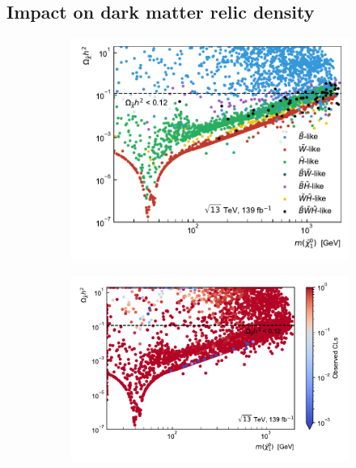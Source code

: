 \subsection{Impact on dark matter relic density}

 \begin{figure}
	\centering
	\begin{subfigure}[b]{0.445\linewidth}
		\centering\includegraphics[width=\textwidth]{scatter/relic_density_lsp}
		\caption{\label{fig:relic_density_lsp}}
	\end{subfigure}\hfill
	\begin{subfigure}[b]{0.555\linewidth}
		\centering\includegraphics[width=\textwidth]{scatter/relic_density_lsp_cls}
		\caption{\label{fig:relic_density_lsp_cls}}

\end{subfigure}
\end{figure}
